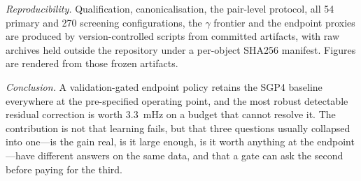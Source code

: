 \documentclass[conference]{IEEEtran}
\begin{document}
\emph{Reproducibility.} Qualification, canonicalisation, the pair-level protocol,
all 54 primary and 270 screening configurations, the $\gamma$ frontier and the
endpoint proxies are produced by version-controlled scripts from committed
artifacts, with raw archives held outside the repository under a per-object SHA256
manifest. Figures are rendered from those frozen artifacts.

\emph{Conclusion.} A validation-gated endpoint policy retains the SGP4 baseline
everywhere at the pre-specified operating point, and the most robust detectable
residual correction is worth $3.3$~mHz on a budget that cannot resolve it. The
contribution is not that learning fails, but that three questions usually
collapsed into one---is the gain real, is it large enough, is it worth anything at
the endpoint---have different answers on the same data, and that a gate can ask
the second before paying for the third.

\IEEEtriggercmd{\relax}


\end{document}
